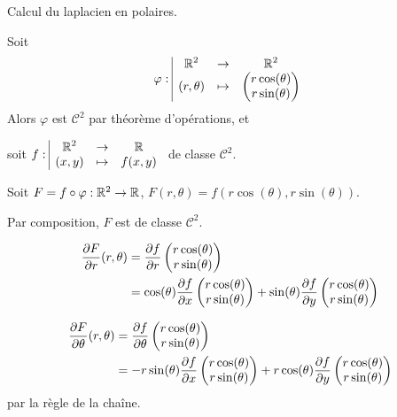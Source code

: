 \begin{exemple}
    Calcul du laplacien en polaires.

    Soit 
    $$\varphi: \space \begin{array}{|ccc} \displaystyle \mathbb{R}^2 & \to & \displaystyle \mathbb{R}^2 \\ \displaystyle (r, \theta) & \mapsto & \displaystyle \begin{pmatrix} 
        r \cos(\theta) \\
        r \sin (\theta)
    \end{pmatrix} \end{array}$$
    Alors $\varphi$ est $\mathscr C^2$ par théorème d'opérations, et 
    
    soit $f: \space \begin{array}{|ccc} \displaystyle \mathbb{R}^2 & \to & \displaystyle \mathbb{R} \\ \displaystyle (x, y) & \mapsto & \displaystyle f(x, y) \end{array}$ de classe $\mathscr C^2$.

    \svspace Soit $F = f \circ \varphi : \mathbb{R}^2 \to \mathbb{R}$, $F(r, \theta) = f(r \cos(\theta), r \sin(\theta))$.

    Par composition, $F$ est de classe $\mathscr C^2$.

    \begin{align}
        \frac{\partial F}{\partial r} (r, \theta) & = \frac{\partial f}{\partial r} \begin{pmatrix}
        r \cos(\theta) \\
        r \sin(\theta)
    \end{pmatrix} \\
    & = \cos( \theta) \frac{\partial f}{\partial x} \begin{pmatrix}
        r \cos(\theta) \\
        r \sin(\theta)
    \end{pmatrix} + \sin(\theta) \frac{\partial f}{\partial y} \begin{pmatrix}
        r \cos(\theta) \\
        r \sin(\theta)
    \end{pmatrix}
    \end{align}

    \begin{align}
        \frac{\partial F}{\partial \theta} (r, \theta) & = \frac{\partial f}{\partial \theta} \begin{pmatrix}
        r \cos(\theta) \\
        r \sin(\theta)
    \end{pmatrix} \\
    & = - r \sin( \theta) \frac{\partial f}{\partial x} \begin{pmatrix}
        r \cos(\theta) \\
        r \sin(\theta)
    \end{pmatrix} + r \cos(\theta) \frac{\partial f}{\partial y} \begin{pmatrix}
        r \cos(\theta) \\
        r \sin(\theta)
    \end{pmatrix}
    \end{align} par la règle de la chaîne.


\end{exemple}
